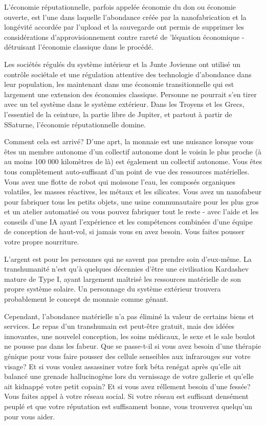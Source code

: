 L'économie réputationnelle, parfois appelée économie du don ou économie ouverte, est l'une dans laquelle l'abondance créée par la nanofabrication et la longévité accordée par l'upload et la sauvegarde ont permis de supprimer les considérations d'approvisionnement contre rareté de 'léquation économique - détruisant l'économie classique dans le procédé. 

Les sociétés régulés du système intérieur et la Junte Jovienne ont utilisé un contrôle sociétale et une régulation attentive des technologie d'abondance dans leur population, les maintenant dans une économie transitionnelle qui est largement une extension des économies classique. Personne ne pourrait s'en tirer avec un tel système dans le système extérieur. Dans les Troyens et les Grecs, l'essentiel de la ceinture, la partie libre de Jupiter, et partout à partir de SSaturne, l'économie réputationnelle domine. 

Comment cela est arrivé? D'une aprt, la monnaie est une nuisance lorsque vous êtes un membre autonome d'un collectif autonome dont le voisin le plus proche (à au moins 100 000 kilomètres de là) est également un collectif autonome. Vous êtes tous complètement auto-suffisant d'un point de vue des ressources matérielles. Vous avez une flotte de robot qui moissone l'eau, les composés organiques volatiles, les masses réactives, les métaux et les silicates. Vous avez un nanofabeur pour fabriquer tous les petits objets, une usine communautaire pour les plus gros et un atelier automatisé ou vous pouvez fabriquer tout le reste - avec l'aide et les conseils d'une IA ayant l'expérience et les compétences combinées d'une équipe de conception de haut-vol, si jamais vous en avez besoin. Vous faites pousser votre propre nourriture. 



L'argent est pour les personnes qui ne savent pas prendre soin d'eux-même. La transhumanité n'est qu'à quelques décennies d'être une civilisation Kardashev mature de Type I, ayant largement maîtrisé les ressources matérielle de son propre système solaire. Un personnage du système extérieur trouvera probablement le concept de monnaie comme génant. 

Cependant, l'abondance matérielle n'a pas éliminé la valeur de certains biens et services. Le repas d'un transhumain est peut-être gratuit, mais des idéées innovantes, une nouvelel conception, les soins médicaux, le sexe et le sale boulot ne pousse pas dans les fabeur. Que se passe-t-il si vous avez besoin d'une thérapie génique pour vous faire pousser des cellule senseibles aux infrarouges sur votre visage? Et si vous voulez assassiner votre fork béta renégat après qu'elle ait balancé une grenade hallucinogène lors du vernissage de votre gallerie et qu'elle ait kidnappé votre petit copain? Et si vous avez réllement besoin d'une fessée? Vous faites appel à votre réseau social. Si votre réseau est suffisant densément peuplé et que votre réputation est suffisament bonne, vous trouverez quelqu'un pour vous aider. 

